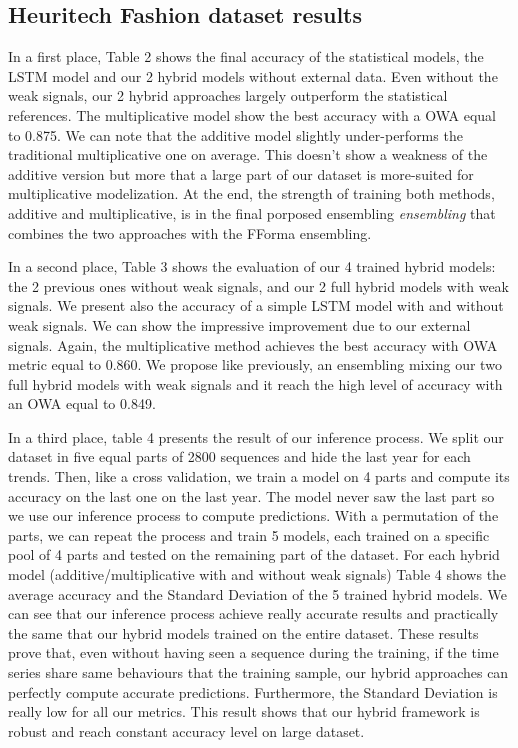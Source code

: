 \documentclass[letterpaper]{article} %
\begin{document}
\subsection{Heuritech Fashion dataset results}

In a first place, Table 2 shows the final accuracy of the statistical models, the LSTM model and our 2 hybrid models without external data. Even without the weak signals, our 2 hybrid approaches largely outperform the statistical references. The multiplicative model show the best accuracy with a OWA equal to 0.875. We can note that the additive model slightly under-performs the traditional multiplicative one on average. This doesn't show a weakness of the additive version but more that a large part of our dataset is more-suited for multiplicative modelization. At the end, the strength of training both methods, additive and multiplicative, is in the final porposed ensembling \textit{ensembling} that combines the two approaches with the FForma ensembling.

In a second place, Table 3 shows the evaluation of our 4 trained hybrid models: the 2 previous ones without weak signals, and our 2 full hybrid models with weak signals. We present also the accuracy of a simple LSTM model with and without weak signals. We can show the impressive improvement due to our external signals. Again, the multiplicative method achieves the best accuracy with OWA metric equal to 0.860. We propose like previously, an ensembling mixing our two full hybrid models with weak signals and it reach the high level of accuracy with an OWA equal to 0.849.

In a third place, table 4 presents the result of our inference process. We split our dataset in five equal parts of 2800 sequences and hide the last year for each trends. Then, like a cross validation, we train a model on 4 parts and compute its accuracy on the last one on the last year. The model never saw the last part so we use our inference process to compute predictions. With a permutation of the parts, we can repeat the process and train 5 models, each trained on a specific pool of 4 parts and tested on the remaining part of the dataset. For each hybrid model (additive/multiplicative with and without weak signals) Table 4 shows the average accuracy and the Standard Deviation of the 5 trained hybrid models. We can see that our inference process achieve really accurate results and practically the same that our hybrid models trained on the entire dataset. These results prove that, even without having seen a sequence during the training, if the time series share same behaviours that the training sample, our hybrid approaches can perfectly compute accurate predictions. Furthermore, the Standard Deviation is really low for all our metrics. This result shows that our hybrid framework is robust and reach constant accuracy level on large dataset.
\end{document}
